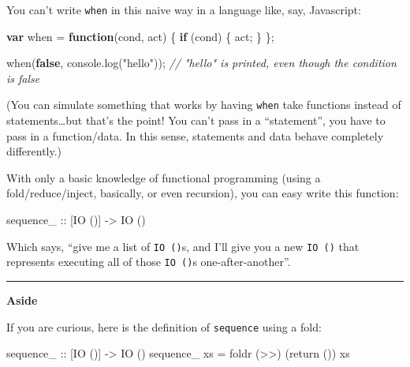 \documentclass[]{article}
\newenvironment{Shaded}{}{}
\newcommand{\AttributeTok}[1]{\textcolor[rgb]{0.49,0.56,0.16}{#1}}
\newcommand{\CommentTok}[1]{\textcolor[rgb]{0.38,0.63,0.69}{\textit{#1}}}
\newcommand{\ControlFlowTok}[1]{\textcolor[rgb]{0.00,0.44,0.13}{\textbf{#1}}}
\newcommand{\DataTypeTok}[1]{\textcolor[rgb]{0.56,0.13,0.00}{#1}}
\newcommand{\FunctionTok}[1]{\textcolor[rgb]{0.02,0.16,0.49}{#1}}
\newcommand{\KeywordTok}[1]{\textcolor[rgb]{0.00,0.44,0.13}{\textbf{#1}}}
\newcommand{\NormalTok}[1]{#1}
\newcommand{\OperatorTok}[1]{\textcolor[rgb]{0.40,0.40,0.40}{#1}}
\newcommand{\OtherTok}[1]{\textcolor[rgb]{0.00,0.44,0.13}{#1}}
\newcommand{\StringTok}[1]{\textcolor[rgb]{0.25,0.44,0.63}{#1}}
\newcommand{\VariableTok}[1]{\textcolor[rgb]{0.10,0.09,0.49}{#1}}
\begin{document}
You can't write \texttt{when} in this naive way in a language like, say,
Javascript:

\begin{Shaded}
\begin{Highlighting}[]
\KeywordTok{var}\NormalTok{ when }\OperatorTok{=} \KeywordTok{function}\NormalTok{(cond}\OperatorTok{,}\NormalTok{ act) }\OperatorTok{\{} \ControlFlowTok{if}\NormalTok{ (cond) }\OperatorTok{\{}\NormalTok{ act}\OperatorTok{;} \OperatorTok{\}} \OperatorTok{\};}

\AttributeTok{when}\NormalTok{(}\KeywordTok{false}\OperatorTok{,} \VariableTok{console}\NormalTok{.}\AttributeTok{log}\NormalTok{(}\StringTok{"hello"}\NormalTok{))}\OperatorTok{;}
\CommentTok{// "hello" is printed, even though the condition is false}
\end{Highlighting}
\end{Shaded}

(You can simulate something that works by having \texttt{when} take functions
instead of statements\ldots{}but that's the point! You can't pass in a
``statement'', you have to pass in a function/data. In this sense, statements
and data behave completely differently.)

With only a basic knowledge of functional programming (using a
fold/reduce/inject, basically, or even recursion), you can easy write this
function:

\begin{Shaded}
\begin{Highlighting}[]
\NormalTok{sequence_}\OtherTok{ ::}\NormalTok{ [}\DataTypeTok{IO}\NormalTok{ ()] }\OtherTok{->} \DataTypeTok{IO}\NormalTok{ ()}
\end{Highlighting}
\end{Shaded}

Which says, ``give me a list of \texttt{IO\ ()}s, and I'll give you a new
\texttt{IO\ ()} that represents executing all of those \texttt{IO\ ()}s
one-after-another''.

\begin{center}\rule{0.5\linewidth}{\linethickness}\end{center}

\textbf{Aside}

If you are curious, here is the definition of \texttt{sequence} using a fold:

\begin{Shaded}
\begin{Highlighting}[]
\NormalTok{sequence_}\OtherTok{ ::}\NormalTok{ [}\DataTypeTok{IO}\NormalTok{ ()] }\OtherTok{->} \DataTypeTok{IO}\NormalTok{ ()}
\NormalTok{sequence_ xs }\FunctionTok{=}\NormalTok{ foldr (}\FunctionTok{>>}\NormalTok{) (return ()) xs}
\end{Highlighting}
\end{Shaded}
\end{document}
